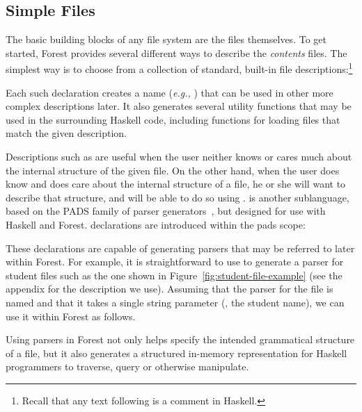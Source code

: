 \documentclass[natbib]{sigplanconf}
\begin{document}
\subsection{Simple Files}
\label{sec:basics}

The basic building blocks of any file system are the files themselves.  To get started,
Forest provides several different ways to describe the {\em contents} files.  The simplest
way is to choose from a collection of standard, built-in file descriptions:\footnote{Recall that
any text following \cd{--} is a comment in Haskell.} 
\noindent
\begin{code}
[forest| 
  type MyText = File Ptext   -- a text file
  type MyBin = File Pbin     -- a binary file
  type Whatever = File Pany  -- any file at all
|]
\end{code}
Each such declaration creates a name ({\it e.g.,} ) that can be used in other
more complex descriptions later.  It also generates several utility functions that may
be used in the surrounding Haskell code, including functions 
for loading files that match the given description.  

Descriptions such as  are useful when the user neither knows or cares much about
the internal structure of the given file.  On the other hand, when the user does know and does
care about the internal structure of a file, he or she will want to describe that structure,
and will be able to do so using \padshaskell{}.  \padshaskell{} is another sublanguage,
based on the PADS family of parser 
generators~\cite{fisher+:pads,fisher+:popl06,mandelbaum+:pads-ml}, but 
designed for use with Haskell and Forest.  \padshaskell{} declarations are introduced
within the pads scope:
\noindent
\begin{code}
\end{code}
These declarations are capable of generating parsers that may be referred
to later within Forest.  For example, it is straightforward to use \padshaskell{} to generate
a parser for student files such as the one shown in Figure~\ref{fig:student-file-example}
(see the appendix for the description we use).
Assuming that the parser for the file is named  and that it takes a single string parameter
(, the student name), we can use it within Forest as follows.
\begin{code}
[forest| 
  type MyStudent (n::String) = File (Student n) 
|]
\end{code}
Using \padshaskell{} parsers in Forest not only helps specify the intended grammatical structure
of a file, but it also generates a structured in-memory representation for Haskell programmers
to traverse, query or otherwise manipulate.
\end{document}
